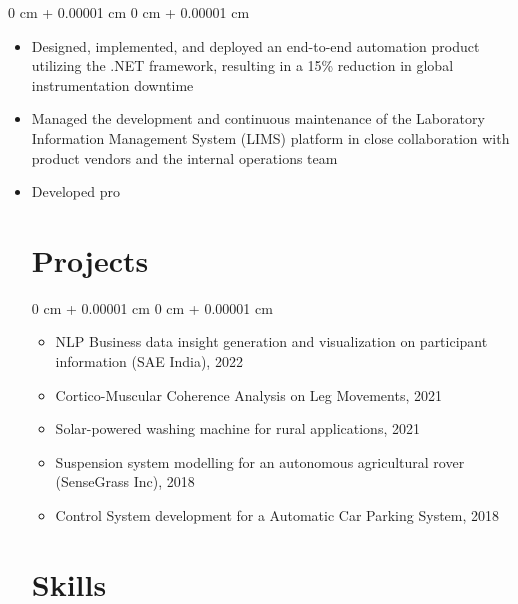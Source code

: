 \documentclass[10pt, letterpaper]{article}
\newenvironment{highlights}{
    \begin{itemize}[
        topsep=0.10 cm,
        parsep=0.10 cm,
        partopsep=0pt,
        itemsep=0pt,
        leftmargin=0 cm + 10pt
    ]
}{
    \end{itemize}
} %
\newenvironment{onecolentry}{
    \begin{adjustwidth}{
        0 cm + 0.00001 cm
    }{
        0 cm + 0.00001 cm
    }
}{
    \end{adjustwidth}
} %
\begin{document}
    \vspace{0.10 cm}
    \begin{onecolentry}
    \begin{highlights}
        \item Designed, implemented, and deployed an end-to-end automation product utilizing the .NET framework, resulting in a 15\% reduction in global instrumentation downtime
        \item Managed the development and continuous maintenance of the Laboratory Information Management System (LIMS) platform in close collaboration with product vendors and the internal operations team
        \item Developed pro


    


    
\section{Projects}
    
    \begin{onecolentry}
    \begin{itemize}
        \item NLP Business data insight generation and visualization on participant information (SAE India), 2022
        \item Cortico-Muscular Coherence Analysis on Leg Movements, 2021
        \item Solar-powered washing machine for rural applications, 2021
        \item Suspension system modelling for an autonomous agricultural rover (SenseGrass Inc), 2018
        \item Control System development for a Automatic Car Parking System, 2018
    \end{itemize}
    \end{onecolentry}
    


    
\section{Skills}


\end{highlights}
\end{onecolentry}
\end{document}
